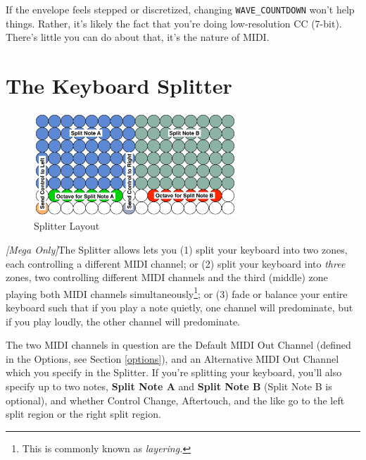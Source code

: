 \documentclass{article}
\begin{document}
If the envelope feels stepped or discretized, changing \texttt{WAVE\_COUNTDOWN} won't help things.  Rather, it's likely the fact that you're doing low-resolution CC (7-bit).  There's little you can do about that, it's the nature of MIDI.

\clearpage

\section {The Keyboard Splitter}
\label{splitter}

\begin{figure}
\vspace{-1.5em}\includegraphics[width=3in]{split}
\vspace{-2em}\caption{\small Splitter Layout}
\label{splitter}
\end{figure}

\textit{[Mega Only]}\qquad The Splitter allows lets you (1) split your keyboard into two zones, each controlling a different MIDI channel; or (2) split your keyboard into {\it three} zones, two controlling different MIDI channels and the third (middle) zone playing both MIDI channels simultaneously\footnote{This is commonly known as {\it layering.}}; or (3) fade or balance your entire keyboard such that if you play a note quietly, one channel will predominate, but if you play loudly, the other channel will predominate.

The two MIDI channels in question are the Default MIDI Out Channel (defined in the Options, see Section \ref{options}), and an Alternative MIDI Out Channel which you specify in the Splitter.  If you're splitting your keyboard, you'll also specify up to two notes, {\bf Split Note A} and {\bf Split Note B}  (Split Note B is optional), and whether Control Change, Aftertouch, and the like go to the left split region or the right split region.
\end{document}

